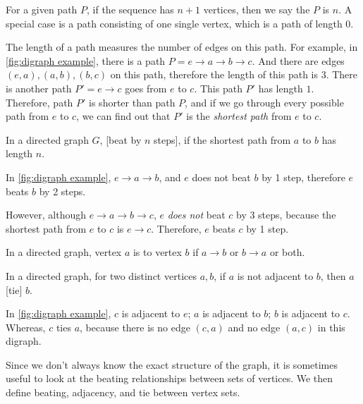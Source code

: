   \begin{definition}
    For a given path \(P\), if the sequence has \(n + 1\) vertices,
    then we say the  \(P\) is \(n\).
    A special case is a path consisting of one single vertex,
    which is a path of length 0.
  \end{definition}

  The length of a path measures the number of edges on this path.
  For example, in \cref{fig:digraph example},
  there is a path \(P = e \to a \to b \to c\).
  And there are edges \((e, a), (a, b), (b, c)\) on this path,
  therefore the length of this path is 3.
  There is another path \(P' = e \to c\) goes from \(e\) to \(c\).
  This path \(P'\) has length \(1\).
  Therefore, path \(P'\) is shorter than path \(P\),
  and if we go through every possible path from \(e\) to \(c\),
  we can find out that \(P'\) is the \emph{shortest path}
  from \(e\) to \(c\).

  \begin{definition}
    In a directed graph \(G\),
    [beat by \(n\) steps],
    if the shortest path from \(a\) to \(b\) has length \(n\).
  \end{definition}

  In \cref{fig:digraph example},
  \(e \to a \to b\),
  and \(e\) does not beat \(b\) by 1 step,
  therefore \(e\) beats \(b\) by 2 steps.

  However, although \(e \to a \to b \to c\),
  \(e\) \emph{does not} beat \(c\) by 3 steps,
  because the shortest path from \(e\) to \(c\) is \(e \to c\).
  Therefore, \(e\) beats \(c\) by 1 step.

  \begin{definition}
    In a directed graph, vertex \(a\) is  to vertex \(b\) if
    \(a \to b\) or \(b \to a\) or both.
  \end{definition}

  \begin{definition}
    In a directed graph, for two distinct vertices \(a, b\),
    if \(a\) is not adjacent to \(b\),
    then \(a\) [tie] \(b\).
  \end{definition}

  In \cref{fig:digraph example}, \(c\) is adjacent to \(e\);
  \(a\) is adjacent to \(b\); \(b\) is adjacent to \(c\).
  Whereas, \(c\) ties \(a\),
  because there is no edge \((c, a)\) and no edge \((a, c)\)
  in this digraph.

  Since we don't always know the exact structure of the graph,
  it is sometimes useful to look at
  the beating relationships between sets of vertices.
  We then define beating, adjacency, and tie between vertex sets.

